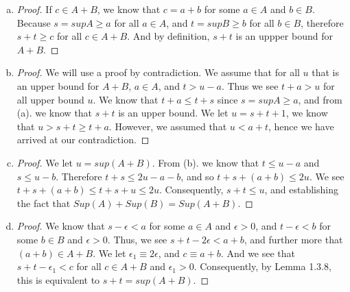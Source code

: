 \documentclass[12pt]{article}
\begin{document}
\begin{enumerate}[a).]
    \item {
        \begin{proof}
            If $c \in A + B$, we know that $c = a + b$ for some $a \in A$ and $b \in B$. 
            Because $s = supA \ge a$ for all $a \in A$, and $t = supB \ge b$ for all $b \in B$, therefore $s+t \ge c$ for all $c \in A + B$. 
            And by definition, $s+t$ is an uppper bound for $A + B$. 
        \end{proof}
    }
    \item {
        \begin{proof}
            We will use a proof by contradiction. 
            We assume that for all $u$ that is an upper bound for $A + B$, $a \in A$, and $t > u - a$. 
            Thus we see $t+a > u$ for all upper bound $u$.
            We know that $t + a \le t + s$ since $s = supA \ge a$, and from (a). we know that $s+t$ is an upper bound. 
            We let $u = s + t + 1$, we know that $u > s+t \ge t + a$. 
            However, we assumed that $u < a+t$, hence we have arrived at our contradiction.
        \end{proof}

    }
    \item {
        \begin{proof}
            We let $u = sup(A+B)$.
            From (b). we know that $t \le u -a$ and $s \le u -b$. 
            Therefore $t+s \le 2u - a - b$, and so $t+s + (a+b) \le 2u$.
            We see $t + s + (a + b) \le t + s + u \le 2u$.
            Consequently, $s + t \le u$, and establishing the fact that $Sup(A) + Sup(B) = Sup(A+B)$. 
        \end{proof}
    }
    \item{
        \begin{proof}
            We know that $s - \epsilon < a$ for some $a \in A$ and $\epsilon > 0$, and $t - \epsilon < b$ for some $b \in B$ and $\epsilon > 0$.
            Thus, we see $s + t - 2\epsilon < a + b$, and further more that $(a+b) \in A + B$.
            We let $\epsilon_1 \equiv 2\epsilon$, and $c \equiv a + b$. 
            And we see that $s+t - \epsilon_1 < c$ for all $c \in A + B$ and $\epsilon_1 > 0$.
            Consequently, by Lemma 1.3.8, this is equivalent to $s + t = sup(A+B)$.
        \end{proof}
    }
\end{enumerate}
\end{document}
